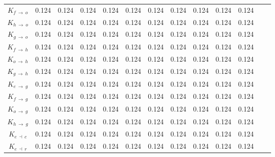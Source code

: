 \begin{ThreePartTable}
\begin{longtable}{c l *{10}{c} c}
        $K_{f \: \rightarrow \: o}$\tnote{e} & 0.124                    & 0.124 & 0.124 & 0.124 & 0.124 & 0.124 & 0.124 & 0.124 & 0.124 & 0.124 \\

        $K_{h \: \rightarrow \: o}$          & 0.124                    & 0.124 & 0.124 & 0.124 & 0.124 & 0.124 & 0.124 & 0.124 & 0.124 & 0.124 \\

        $K_{g \: \rightarrow \: o}$          & 0.124                    & 0.124 & 0.124 & 0.124 & 0.124 & 0.124 & 0.124 & 0.124 & 0.124 & 0.124 \\

        $K_{f \: \rightarrow \: h}$          & 0.124                    & 0.124 & 0.124 & 0.124 & 0.124 & 0.124 & 0.124 & 0.124 & 0.124 & 0.124 \\

        $K_{o \: \rightarrow \: h}$          & 0.124                    & 0.124 & 0.124 & 0.124 & 0.124 & 0.124 & 0.124 & 0.124 & 0.124 & 0.124 \\

        $K_{g \: \rightarrow \: h}$          & 0.124                    & 0.124 & 0.124 & 0.124 & 0.124 & 0.124 & 0.124 & 0.124 & 0.124 & 0.124 \\

        $K_{e \: \rightarrow \: g}$          & 0.124                    & 0.124 & 0.124 & 0.124 & 0.124 & 0.124 & 0.124 & 0.124 & 0.124 & 0.124 \\

        $K_{f \: \rightarrow \: g}$          & 0.124                    & 0.124 & 0.124 & 0.124 & 0.124 & 0.124 & 0.124 & 0.124 & 0.124 & 0.124 \\

        $K_{o \: \rightarrow \: g}$          & 0.124                    & 0.124 & 0.124 & 0.124 & 0.124 & 0.124 & 0.124 & 0.124 & 0.124 & 0.124 \\

        $K_{h \: \rightarrow \: g}$          & 0.124                    & 0.124 & 0.124 & 0.124 & 0.124 & 0.124 & 0.124 & 0.124 & 0.124 & 0.124 \\

        $K_{e \: \dashv \: c}$               & 0.124                    & 0.124 & 0.124 & 0.124 & 0.124 & 0.124 & 0.124 & 0.124 & 0.124 & 0.124 \\

        $K_{e \: \dashv \: r}$               & 0.124                    & 0.124 & 0.124 & 0.124 & 0.124 & 0.124 & 0.124 & 0.124 & 0.124 & 0.124 \\


\end{longtable}
\end{ThreePartTable}
